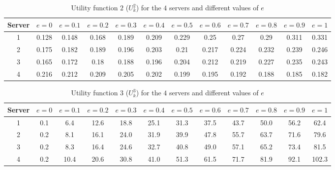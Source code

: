 \begin{table}[H]
    \caption{Utility function \(2\) (\(U_k^2\)) for the \(4\) servers and
    different values of \(e\)}
    \label{tab:case_study_utility_2_all_servers}
    \begin{adjustbox}{width=\columnwidth,center}
        \begin{tabular}{|c|c|c|c|c|c|c|c|c|c|c|c|}
            \hline
            Server & \(e = 0\) & \(e = 0.1\) & \(e = 0.2\) & \(e = 0.3\)
                   & \(e = 0.4\) & \(e = 0.5\) & \(e = 0.6\) & \(e = 0.7\)
                   & \(e = 0.8\) & \(e = 0.9\) & \(e = 1\) \\
            \hline
            1 & 0.128 & 0.148 & 0.168 & 0.189 & 0.209 & 0.229 & 0.25 & 0.27
            & 0.29 & 0.311 & 0.331 \\
            2 & 0.175 & 0.182 & 0.189 & 0.196 & 0.203 & 0.21 & 0.217 & 0.224
            & 0.232 & 0.239 & 0.246 \\
            3 & 0.165 & 0.172 & 0.18 & 0.188 & 0.196 & 0.204 & 0.212 & 0.219
            & 0.227 & 0.235 & 0.243 \\
            4 & 0.216 & 0.212 & 0.209 & 0.205 & 0.202 & 0.199 & 0.195 & 0.192
            & 0.188 & 0.185 & 0.182 \\
            \hline
        \end{tabular}
    \end{adjustbox}
\end{table}

\begin{table}[H]
    \caption{Utility function \(3\) (\(U_k^3\)) for the \(4\) servers and
    different values of \(e\)}
    \label{tab:case_study_utility_3_all_servers}
    \begin{adjustbox}{width=\columnwidth,center}
        \begin{tabular}{|c|c|c|c|c|c|c|c|c|c|c|c|}
            \hline
            Server & \(e = 0\) & \(e = 0.1\) & \(e = 0.2\) & \(e = 0.3\)
                   & \(e = 0.4\) & \(e = 0.5\) & \(e = 0.6\) & \(e = 0.7\)
                   & \(e = 0.8\) & \(e = 0.9\) & \(e = 1\) \\
            \hline
            1 & 0.1 & 6.4 & 12.6 & 18.8 & 25.1 & 31.3 & 37.5 & 43.7 & 50.0
            & 56.2 & 62.4 \\
            2 & 0.2 & 8.1 & 16.1 & 24.0 & 31.9 & 39.9 & 47.8 & 55.7 & 63.7
            & 71.6 & 79.6 \\
            3 & 0.2 & 8.3 & 16.4 & 24.6 & 32.7 & 40.8 & 49.0 & 57.1 & 65.2
            & 73.4 & 81.5 \\
            4 & 0.2 & 10.4 & 20.6 & 30.8 & 41.0 & 51.3 & 61.5 & 71.7 & 81.9
            & 92.1 & 102.3 \\
            \hline
        \end{tabular}
    \end{adjustbox}
\end{table}


